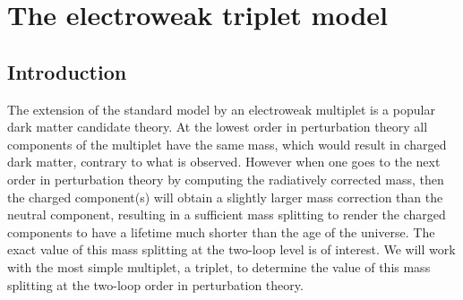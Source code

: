 \documentclass[11pt]{article}
\begin{document}
% 
% 
% 
 
 



\section{The electroweak triplet model}
\subsection{Introduction}

The extension of the standard model by an electroweak multiplet is a popular dark matter candidate theory.  At the lowest order in perturbation theory all components of the multiplet have the same mass, which would result in charged dark matter, contrary to what is observed.  However when one goes to the next order in perturbation theory by computing the radiatively corrected mass, then the charged component(s) will obtain a slightly larger mass correction than the neutral component, resulting in a sufficient mass splitting to render the charged components to have a lifetime much shorter than the age of the universe.  The exact value of this mass splitting at the two-loop level is of interest.  We will work with the most simple multiplet, a triplet, to determine the value of this mass splitting at the two-loop order in perturbation theory.\\
\end{document}
